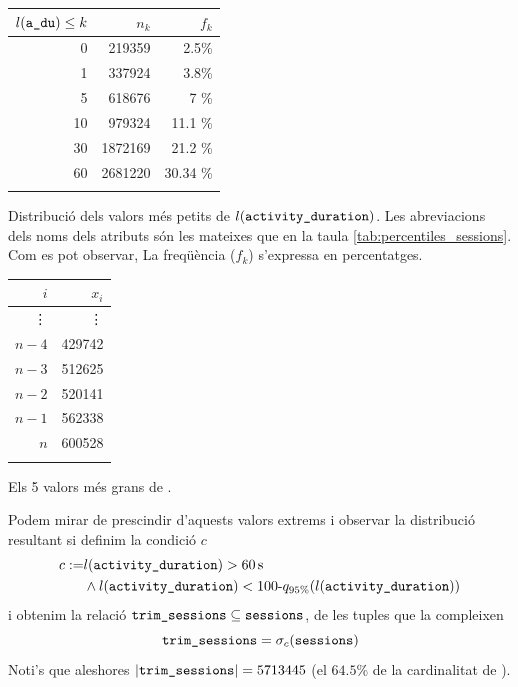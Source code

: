 \documentclass[
	a4paper,
	twoside,
	justified
]{tufte-book}
\begin{document}
\begin{enumerate}[(1)]
\begin{enumerate}[(a)]
	\end{enumerate} 
	
	\begin{margintable}
    \label{tab:activity_duration_mins}
    \begin{tabular}{rrr}
    \toprule
    $l(\texttt{a\_du}) \leq k$ & $n_k$ & $f_k$ \\
    \midrule
    0 & 219359 & 2.5\% \\
    1 & 337924 & 3.8\% \\
    5 & 618676 & 7 \% \\
    10 & 979324 & 11.1 \% \\
    30 & 1872169 & 21.2 \% \\
    60 & 2681220 & 30.34 \% \\
    \bottomrule \\
    \end{tabular}
    
    \caption[]{
    Distribució dels valors més petits de $l(\texttt{activity\_duration})$. Les abreviacions dels noms dels atributs són les mateixes que en la taula \ref{tab:percentiles_sessions}. Com es pot observar, La freqüència ($f_k$) s'expressa en percentatges.  
    }
  \end{margintable}
	
	\begin{margintable}
	\begin{center}
	\begin{tabular}{rr}
	\toprule
 	$i$ & $x_i$ \\
	\midrule
	\vdots & \vdots \\
	$n-4$ & 429742 \\
	$n-3$ & 512625 \\
	$n-2$ & 520141 \\
	$n-1$ & 562338 \\
	$n$   & 600528 \\ 
	\bottomrule \\
	\end{tabular}
	\end{center}
	\caption{
		\label{tab:max_activity_duration_vals}
		Els 5 valors més grans de .  
	}
	\end{margintable}

Podem mirar de prescindir d'aquests valors extrems i observar la distribució resultant si definim la condició $c$
	\begin{align*}
	c := & l(\texttt{activity\_duration}) > \SI{60}{\second} \\
			& \wedge l(\texttt{activity\_duration}) < 100\text{-}q_{95\%}(l(\texttt{activity\_duration})) 
	\end{align*}
	i obtenim la relació $\texttt{trim\_sessions} \subseteq \texttt{sessions}$, de les tuples que la compleixen
	$$
	\texttt{trim\_sessions} = \sigma_{c}(\texttt{sessions})	
	$$
  Noti's que aleshores $|\texttt{trim\_sessions}| = 5713445$ (el $64.5\%$ de la cardinalitat de ).
  

\end{enumerate}
\end{document}
